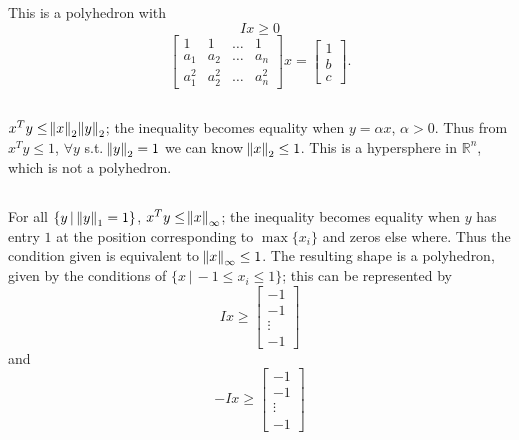 \documentclass[11pt]{article}
\begin{document}
\maketitle
\section{}
\subsection{}
This is a polyhedron with $$Ix\geq0 $$ $$\begin{bmatrix} 1 & 1 & \dots &1\\a_1 & a_2 & \dots&a_n\\a_1^2&a_2^2&\dots&a_n^2 \end{bmatrix}x=\begin{bmatrix}1\\b\\c \end{bmatrix}.$$
\subsection{}
$x^Ty\leq\norm{x}_2\norm{y}_2$; the inequality becomes equality when $y=\alpha x$, $\alpha > 0$. Thus from $x^Ty\leq 1$, $\forall y$ s.t. $\norm{y}_2=1$ we can know $\norm{x}_2\leq1$. This is a hypersphere in $\mathbb{R}^n$, which is not a polyhedron.
\subsection{}
For all $\{y\, |\,\norm{y}_1=1\}$, $x^Ty\leq\norm{x}_\infty$; the inequality becomes equality when $y$ has entry $1$ at the position corresponding to $\max \{x_i\}$ and zeros else where. Thus the condition given is equivalent to $\norm{x}_\infty\leq1$. The resulting shape is a polyhedron, given by the conditions of $\{x\, |\, -1\leq x_i\leq1\}$; this can be represented by $$Ix\geq \begin{bmatrix} -1\\-1\\ \vdots \\-1\end{bmatrix}$$ and $$-Ix\geq \begin{bmatrix} -1\\-1\\ \vdots \\-1\end{bmatrix}$$
\end{document}
